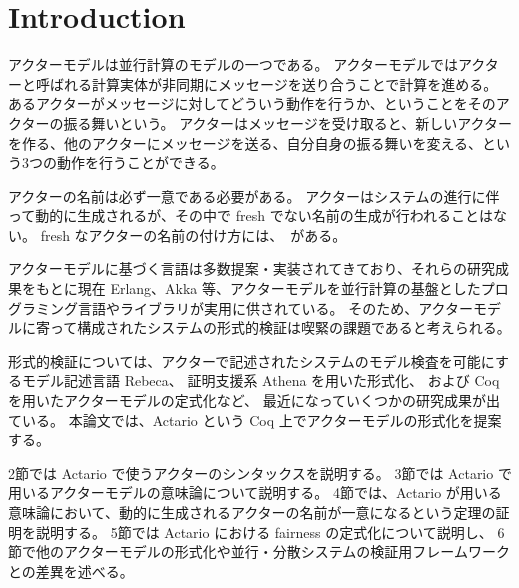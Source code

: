 \section{Introduction}
アクターモデルは並行計算のモデルの一つである。
アクターモデルではアクターと呼ばれる計算実体が非同期にメッセージを送り合うことで計算を進める。
あるアクターがメッセージに対してどういう動作を行うか、ということをそのアクターの振る舞いという。
アクターはメッセージを受け取ると、新しいアクターを作る、他のアクターにメッセージを送る、自分自身の振る舞いを変える、という3つの動作を行うことができる。

アクターの名前は必ず一意である必要がある。
アクターはシステムの進行に伴って動的に生成されるが、その中で fresh でない名前の生成が行われることはない。
fresh なアクターの名前の付け方には、~がある。

アクターモデルに基づく言語は多数提案・実装されてきており、それらの研究成果をもとに現在 Erlang、Akka 等、アクターモデルを並行計算の基盤としたプログラミング言語やライブラリが実用に供されている。
そのため、アクターモデルに寄って構成されたシステムの形式的検証は喫緊の課題であると考えられる。

形式的検証については、アクターで記述されたシステムのモデル検査を可能にするモデル記述言語 Rebeca、
証明支援系 Athena を用いた形式化、
および Coq を用いたアクターモデルの定式化など、
最近になっていくつかの研究成果が出ている。
本論文では、Actario という Coq 上でアクターモデルの形式化を提案する。

2節では Actario で使うアクターのシンタックスを説明する。
3節では Actario で用いるアクターモデルの意味論について説明する。
4節では、Actario が用いる意味論において、動的に生成されるアクターの名前が一意になるという定理の証明を説明する。
5節では Actario における fairness の定式化について説明し、
6節で他のアクターモデルの形式化や並行・分散システムの検証用フレームワークとの差異を述べる。
